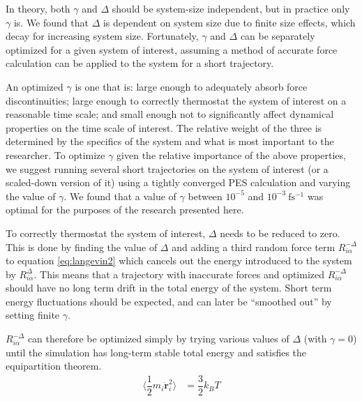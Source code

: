 \documentclass[aps,prl,reprint,amsmath,amssymb]{revtex4-1}
\begin{document}
In theory, both $\gamma$ and $\Delta$ should be system-size independent, but in practice only $\gamma$ is.
We found that $\Delta$ is dependent on system size due to finite size effects, which decay for increasing system size.
Fortunately, $\gamma$ and $\Delta$ can be separately optimized for a given system of interest, assuming a method of accurate force calculation can be applied to the system for a short trajectory. 

An optimized $\gamma$ is one that is: large enough to adequately absorb force discontinuities; large enough to correctly thermostat the system of interest on a reasonable time scale; and small enough not to significantly affect dynamical properties on the time scale of interest. 
The relative weight of the three is determined by the specifics of the system and what is most important to the researcher. 
To optimize $\gamma$ given the relative importance of the above properties, we suggest running several short trajectories on the system of interest (or a scaled-down version of it) using a tightly converged PES calculation and varying the value of $\gamma$. 
We found that a value of $\gamma$ between $10^{-5}$ and $10^{-3}\ \mathrm{fs^{-1}}$ was optimal for the purposes of the research presented here.

To correctly thermostat the system of interest, $\Delta$ needs to be reduced to zero.
This is done by finding the value of $\Delta$ and adding a third random force term $R^{-\Delta}_{i\alpha}$ to equation \ref{eq:langevin2} which cancels out the energy introduced to the system by $R^{\Delta}_{i\alpha}$.
This means that a trajectory with inaccurate forces and optimized $R^{-\Delta}_{i\alpha}$ should have no long term drift in the total energy of the system. 
Short term energy fluctuations should be expected, and can later be ``smoothed out'' by setting finite $\gamma$.

$R^{-\Delta}_{i\alpha}$ can therefore be optimized simply by trying various values of $\Delta$ (with \mbox{$\gamma = 0$}) until the simulation has long-term stable total energy and satisfies the equipartition theorem. 
%
\begin{align}
\label{eq:eqipartition}
\langle \dfrac{1}{2} m_i \dot{\bm{r}}^{2}_{i} \rangle &= \dfrac{3}{2} k_{B} T
\end{align}
%
\end{document}
